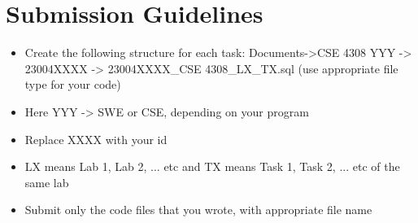\documentclass[12pt,a4paper]{article}
\begin{document}
\section{Submission Guidelines}
\begin{itemize}
    \item Create the following structure for each task: Documents->CSE 4308 YYY -> 23004XXXX -> 23004XXXX\_CSE 4308\_LX\_TX.sql (use appropriate file type for your code)
    \item Here YYY -> SWE or CSE, depending on your program
    \item Replace XXXX with your id
    \item LX means Lab 1, Lab 2, ... etc and TX means Task 1, Task 2, ... etc of the same lab
    \item Submit only the code files that you wrote, with appropriate file name
\end{itemize}
\end{document}
